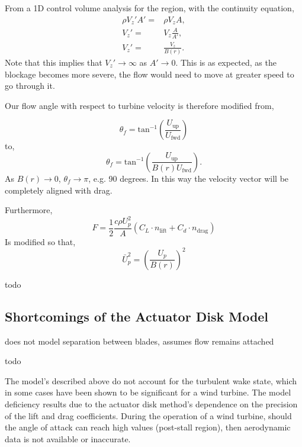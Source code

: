From a 1D control volume analysis for the region, with the continuity
equation, 
\begin{eqnarray}
 \rho V_z' A' =& \rho V_z A,\\
 V_z' =& V_z \frac{A}{A'}, \\
 V_z' =& \frac{V_z}{B(r)}.
\end{eqnarray}
Note that this implies that $V_z' \rightarrow \infty$ as $A' \rightarrow
0$. This is as expected, as the blockage becomes more severe, the flow
would need to move at greater speed to go through it. 

Our flow angle with respect to turbine velocity is therefore modified
from,

\begin{equation}
 \theta_f = \text{tan}^{-1}(\frac{U_{\text{up}}}{U_{\text{fwd}}})
\end{equation}
to,
\begin{equation}
 \theta_f = \text{tan}^{-1}(\frac{U_{\text{up}}}{B(r) U_{\text{fwd}}}). 
\end{equation}
As $B(r) \rightarrow 0$, $\theta_f \rightarrow \pi$, e.g. 90 degrees. In
this way the velocity vector will be completely aligned with drag. 

Furthermore, 
\begin{equation}
 F = \frac{1}{2}\frac{c \rho U_p^2}{A}(C_L \cdot n_{\text{lift}} + C_d \cdot n_{\text{drag}})
\end{equation}
Is modified so that, 
\begin{equation}
 \bar U_p^{2} = \left(\frac{U_p}{B(r)}\right)^2
\end{equation}

todo

\subsection{Shortcomings of the Actuator Disk Model}
\label{subsec:wake_loss_model}

does not model separation between blades, assumes flow remains attached

todo

The model's described above do not account for the turbulent wake state,
which in some cases have been shown to be significant for a wind
turbine. The model deficiency results due to the actuator disk
method's dependence on the precision of the lift and drag
coefficients. During the operation of a wind turbine, should the angle
of attack can reach high values (post-stall region), then aerodynamic 
data is not available or inaccurate. 
   
